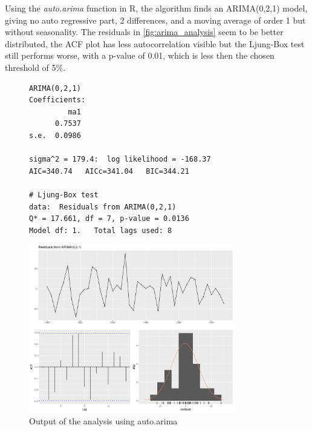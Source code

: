 \documentclass[10pt]{article}
\begin{document}
Using the \textit{auto.arima} function in R, the algorithm finds an ARIMA(0,2,1) model, giving no auto regressive part, 2 differences, and a moving average of order 1 but without seasonality. The residuals in \autoref{fig:arima_analysis} seem to be better distributed, the ACF plot has less autocorrelation visible but the Ljung-Box test still performs worse, with a p-value of 0.01, which is less then the chosen threshold of 5\%.
\clearpage
\begin{figure}[ht!]
\begin{minipage}{.6\textwidth}  %
\lstset{linewidth = 6cm, breaklines=true} %
\begin{lstlisting}[basicstyle=\footnotesize,numbers=none]
ARIMA(0,2,1) 
Coefficients:
         ma1
      0.7537
s.e.  0.0986

sigma^2 = 179.4:  log likelihood = -168.37
AIC=340.74   AICc=341.04   BIC=344.21

# Ljung-Box test
data:  Residuals from ARIMA(0,2,1)
Q* = 17.661, df = 7, p-value = 0.0136
Model df: 1.   Total lags used: 8
\end{lstlisting}
\end{minipage}
\qquad %
\begin{minipage}{0.6\textwidth} %
    \centering
    \includegraphics[width=0.8\textwidth]{img/check_resid_auto_arima.png}
\end{minipage}
\caption{Output of the analysis using auto.arima}
\label{fig:arima_analysis}
\end{figure}
\end{document}
